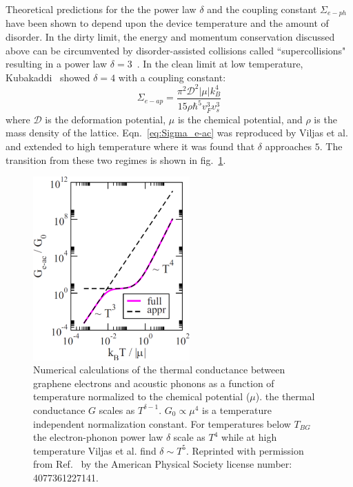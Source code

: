 Theoretical predictions for the the power law $\delta$ and the coupling constant $\Sigma_{e-ph}$ have been shown to depend upon the device temperature and the amount of disorder. In the dirty limit, the energy and momentum conservation discussed above can be circumvented by disorder-assisted collisions called ``supercollisions" resulting in a  power law $\delta=3$~\cite{song_disorder-assisted_2012}. In the clean limit at low temperature, Kubakaddi~\cite{kubakaddi_interaction_2009} showed $\delta = 4$ with a coupling constant:
\begin{equation}\label{eq:Sigma_e-ac}
\Sigma_{e-ap}=\frac{\pi^2\mathcal{D}^2\lvert\mu\rvert k_B^4}{15\rho\hbar^5v_F^3v_s^3}
\end{equation}
where $\mathcal{D}$ is the deformation potential, $\mu$ is the chemical potential, and $\rho$ is the mass density of the lattice.
Eqn.~\ref{eq:Sigma_e-ac} was reproduced by
Viljas et al.~\cite{viljas_electron-phonon_2010} and extended to high temperature where it was found that $\delta$ approaches $5$. The transition from these two regimes is shown in fig.~\ref{fig:viljas2010}.
\begin{figure}
\centering
\includegraphics[width = 60mm]{figures/electronic_cooling/Viljas2010_conduction.png}
\caption{Numerical calculations of the thermal conductance between graphene electrons and acoustic phonons as a function of temperature normalized to the chemical potential ($\mu$). the thermal conductance $G$ scales as $T^{\delta-1}$. $G_0\propto\mu^4$ is a temperature independent normalization constant. For temperatures below $T_{BG}$ the electron-phonon power law $\delta$ scale as $T^4$ while at high temperature Viljas et al. find $\delta\sim T^5$. Reprinted with permission from Ref.~\cite{viljas_electron-phonon_2010} by the American Physical Society license number: 4077361227141.}
\label{fig:viljas2010}
\end{figure}


